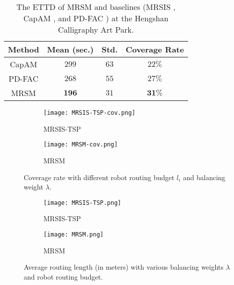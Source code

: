 \begin{table}[h]
  \centering
  \caption{The ETTD of MRSM and baselines (MRSIS \cite{li2024mrsis}, CapAM \cite{paull2022learning}, and PD-FAC \cite{sheng2022pd}) at the Hengshan Calligraphy Art Park.}
  \label{ETTD table in Calligraphy}
  \begin{tabular}{cccc}
  \toprule
  Method         & Mean (sec.) & Std. & Coverage Rate \\
  \midrule
  CapAM          & $299$       & $63$ & $22\%$ \\
  PD-FAC         & $268$       & $55$ & $27\%$ \\
  MRSM           & $\mathbf{196}$ & $31$  & $\mathbf{31\%}$ \\
  \bottomrule
  \end{tabular}
\end{table}

\begin{figure}
   \centering
   \begin{subfigure}[b]{0.45\textwidth}
       \texttt{[image: MRSIS-TSP-cov.png]}
       \caption{MRSIS-TSP\cite{li2024mrsis}}
   \end{subfigure}
   \hfill
   \quad
   \centering
   \begin{subfigure}[b]{0.45\textwidth}
       \texttt{[image: MRSM-cov.png]}
       \caption{MRSM}
   \end{subfigure}
   \hfill
   \caption{Coverage rate with different robot routing budget $l_i$ and balancing weight $\lambda$.}
   \label{fig:lbd-cov}
\end{figure}

\begin{figure}
   \centering
   \begin{subfigure}[b]{0.45\textwidth}
       \texttt{[image: MRSIS-TSP.png]}
       \caption{MRSIS-TSP\cite{li2024mrsis}}
   \end{subfigure}
   \hfill
   \quad
   \centering
   \begin{subfigure}[b]{0.45\textwidth}
       \texttt{[image: MRSM.png]}
       \caption{MRSM}
   \end{subfigure}
   \hfill
   \caption{Average routing length (in meters) with various balancing weights $\lambda$ and robot routing budget.}
   \label{fig:routing}
\end{figure}

